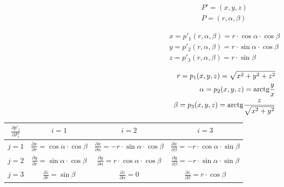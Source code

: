 \begin{equation}
\begin{split}
P' = (x, y, z) \\
P = (r, \alpha, \beta)
\end{split}
\end{equation}

\begin{equation}
\begin{split}
x = p'_1(r, \alpha, \beta) = r \cdot \cos \alpha \cdot \cos \beta \\
y = p'_2(r, \alpha, \beta) = r \cdot \sin \alpha \cdot \cos \beta \\
z = p'_3(r, \alpha, \beta) = r \cdot \sin \beta
\end{split}
\end{equation}

\begin{equation}
\begin{split}
r = p_1(x, y, z) = \sqrt{x^2 + y^2 + z^2} \\
\alpha = p_2(x, y, z) = \mathrm{arctg} \frac{y}{x} \\
\beta = p_3(x, y, z) = \mathrm{arctg} \frac{z}{\sqrt{x^2 + y^2}}
\end{split}
\end{equation}

\begin{tabular}{| c || c | c | c |}
\hline
\(\frac{\partial p'_j}{\partial P_i}\) & \(i=1\) & \(i=2\) & \(i=3\) \\
\hline
\hline
\(j=1\) & \(\frac{\partial x}{\partial r} = \cos \alpha \cdot \cos \beta\) & \(\frac{\partial x}{\partial \alpha} = -r \cdot \sin \alpha \cdot \cos \beta\) & \(\frac{\partial x}{\partial \beta} = -r \cdot \cos \alpha \cdot \sin \beta\) \\
\hline
\(j=2\) & \(\frac{\partial y}{\partial r} = \sin \alpha \cdot \cos \beta\) & \(\frac{\partial y}{\partial \alpha} = r \cdot \cos \alpha \cdot \cos \beta\) & \(\frac{\partial y}{\partial \beta} = -r \cdot \sin \alpha \cdot \sin \beta\) \\
\hline
\(j=3\) & \(\frac{\partial z}{\partial r} = \sin \beta\) & \(\frac{\partial z}{\partial \alpha} = 0\) & \(\frac{\partial z}{\partial \beta} = r \cdot \cos \beta\) \\
\hline
\end{tabular}

